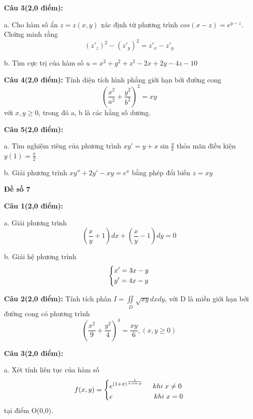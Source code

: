 \documentclass[14pt, a4paper]{article}
\begin{document}
	\vspace{0.5cm}
	
	\textbf{Câu 3(2,0 điểm):}
	
	a. Cho hàm số ẩn $ z=z(x,y) $ xác định từ phương trình $ cos(x-z)= {e^{y-z}} $. Chứng minh rằng \[{({z'_z})^2} - {({z'_y})^2} = {z'_x} - {z'_y}\]
	
	b. Tìm cực trị của hàm số $ u = {x^2} + {y^2} + {z^2} - 2x + 2y - 4z - 10 $
	
	\vspace{0.5cm}
	
	\textbf{Câu 4(2,0 điểm):} Tính diện tích hình phẳng giới hạn bởi đường cong \[{\left( {\frac{{{x^2}}}{{{a^2}}} + \frac{{{y^2}}}{{{b^2}}}} \right)^2} = xy\] với $ x,y \geqslant 0 $, trong đó a, b là các hằng số dương.
	
	
	\vspace{0.5cm}
	
	\textbf{Câu 5(2,0 điểm):}
	
	a. Tìm nghiệm riêng của phương trình $  xy' = y + x\sin \frac{y}{x} $ thỏa mãn điều kiện $ y(1) = \frac{\pi }{2} $
	
	b. Giải phương trình $ xy'' + 2y' - xy = {e^x} $ bằng phép đổi biến $ z=xy $
	
	\pagebreak
	
	\begin{center}
		{\large \textbf{Đề số 7}}
	\end{center}
	
	\textbf{Câu 1(2,0 điểm):}
	
	a. Giải phương trình \[(\frac{x}{y} + 1)dx + (\frac{x}{y} - 1)dy = 0\]
	
	b. Giải hệ phương trình \[\left\{ \begin{gathered}
		x' = 3x - y \hfill \\
		y' = 4x - y \hfill \\ 
	\end{gathered}  \right.\]
	
	\vspace{0.5cm}
	
	\textbf{Câu 2(2,0 điểm):} Tính tích phân $ I = \iint\limits_D {\sqrt {xy} dxdy} $, với D là miền giới hạn bởi đường cong có phương trình \[{(\frac{{{x^2}}}{9} + \frac{{{y^2}}}{4})^4} = \frac{{xy}}{6},(x,y \geqslant 0)\]
	
	\vspace{0.5cm}
	
	\textbf{Câu 3(2,0 điểm):}
	
	a. Xét tính liên tục của hàm số
	\[f(x,y) = \left\{ \begin{gathered}
		{e^{{{(1 + x)}^{\frac{1}{{x\cos y}}}}}} \hspace{0.5cm} khi \hspace{0.1cm} x \ne 0  \hfill \\
		e \hspace{2.1cm} khi \hspace{0.1cm} x = 0 \hfill \\ 
	\end{gathered}  \right.\] tại điểm O(0,0).
\end{document}

